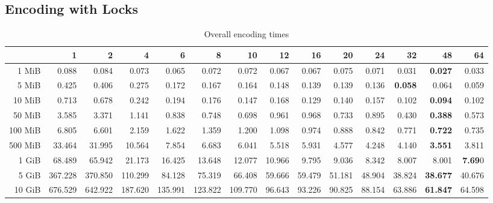 \subsection{Encoding with Locks}
\begin{centering}
\begin{table}[!h]
	\caption{Overall encoding times}
	\begin{tabular}{rrrrrrrrrrrrrr}
		\toprule
		\diagbox[width=7em]{Size}{Threads} & 1  &      2  &      4  &      6  &      8  &      10 &     12 &     16 &     20 &     24 &     32 &     48 &     64 \\
		\midrule
		1 MiB   &   0.088 &   0.084 &   0.073 &   0.065 &   0.072 &   0.072 &  0.067 &  0.067 &  0.075 &  0.071 &  0.031 &  \textbf{0.027} &  0.033 \\
		5 MiB   &   0.425 &   0.406 &   0.275 &   0.172 &   0.167 &   0.164 &  0.148 &  0.139 &  0.139 &  0.136 &  \textbf{0.058} &  0.064 &  0.059 \\
		10 MiB  &   0.713 &   0.678 &   0.242 &   0.194 &   0.176 &   0.147 &  0.168 &  0.129 &  0.140 &  0.157 &  0.102 &  \textbf{0.094} &  0.102 \\
		50 MiB  &   3.585 &   3.371 &   1.141 &   0.838 &   0.748 &   0.698 &  0.961 &  0.968 &  0.733 &  0.895 &  0.430 &  \textbf{0.388} &  0.573 \\
		100 MiB &   6.805 &   6.601 &   2.159 &   1.622 &   1.359 &   1.200 &  1.098 &  0.974 &  0.888 &  0.842 &  0.771 &  \textbf{0.722} &  0.735 \\
		500 MiB &  33.464 &  31.995 &  10.564 &   7.854 &   6.683 &   6.041 &  5.518 &  5.931 &  4.577 &  4.248 &  4.140 &  \textbf{3.551} &  3.811 \\
		1 GiB   &  68.489 &  65.942 &  21.173 &  16.425 &  13.648 &  12.077 & 10.966 &  9.795 &  9.036 &  8.342 &  8.007 &  8.001 &  \textbf{7.69}0 \\
		5 GiB   & 367.228 & 370.850 & 110.299 &  84.128 &  75.319 &  66.408 & 59.666 & 59.479 & 51.181 & 48.904 & 38.824 & \textbf{38.677} & 40.676 \\
		10 GiB  & 676.529 & 642.922 & 187.620 & 135.991 & 123.822 & 109.770 & 96.643 & 93.226 & 90.825 & 88.154 & 63.886 & \textbf{61.847} & 64.598 \\
		\bottomrule
	\end{tabular}
	

\end{table}
\end{centering}
